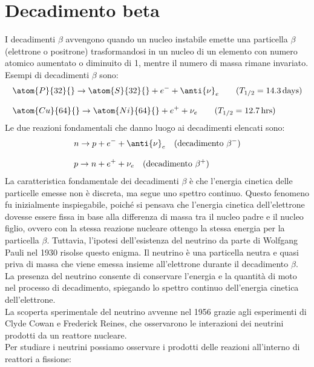 \section{Decadimento beta}
I decadimenti $\beta$ avvengono quando un nucleo instabile emette una particella $\beta$ (elettrone o positrone) trasformandosi in un nucleo di un elemento con numero atomico aumentato o diminuito di 1, mentre il numero di massa rimane invariato. Esempi di decadimenti $\beta$ sono:
\begin{equation}
    \begin{split}
        &\atom{P}{32}{} \to \atom{S}{32}{} + e^- + \anti{\nu}_{e} \qquad (T_{1/2} = 14.3\,\text{days}) \\[8pt]
        &\atom{Cu}{64}{} \to \atom{Ni}{64}{} + e^+ + {\nu}_{e} \qquad (T_{1/2} = 12.7\,\text{hrs})
    \end{split}
\end{equation}
Le due reazioni fondamentali che danno luogo ai decadimenti elencati sono:
\begin{equation}
    \begin{split}
        & n \to p + e^- + \anti{\nu}_{e} \quad \text{(decadimento $\beta^-$)} \\[8pt]
        & p \to n + e^+ + {\nu}_{e} \quad \text{(decadimento $\beta^+$)}
    \end{split}
\end{equation}
La caratteristica fondamentale dei decadimenti $\beta$ è che l'energia cinetica delle particelle emesse non è discreta, ma segue uno spettro continuo. Questo fenomeno fu inizialmente inspiegabile, poiché si pensava che l'energia cinetica dell'elettrone dovesse essere fissa in base alla differenza di massa tra il nucleo padre e il nucleo figlio, ovvero con la stessa reazione nucleare ottengo la stessa energia per la particella $\beta$. Tuttavia, l'ipotesi dell'esistenza del neutrino da parte di Wolfgang Pauli nel 1930 risolse questo enigma. Il neutrino è una particella neutra e quasi priva di massa che viene emessa insieme all'elettrone durante il decadimento $\beta$. La presenza del neutrino consente di conservare l'energia e la quantità di moto nel processo di decadimento, spiegando lo spettro continuo dell'energia cinetica dell'elettrone.\\
La scoperta sperimentale del neutrino avvenne nel 1956 grazie agli esperimenti di Clyde Cowan e Frederick Reines, che osservarono le interazioni dei neutrini prodotti da un reattore nucleare.\\
Per studiare i neutrini possiamo osservare i prodotti delle reazioni all'interno di reattori a fissione:
